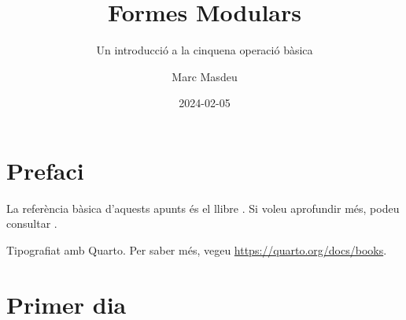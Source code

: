 \documentclass[
  letterpaper,
  DIV=11,
  numbers=noendperiod]{scrreprt}
\title{Formes Modulars}
\subtitle{Un introducció a la cinquena operació bàsica}
\author{Marc Masdeu}
\date{2024-02-05}
\renewcommand*\contentsname{Taula de continguts}
\newcommand\contentsname{Taula de continguts}
\theoremstyle{plain}
\theoremstyle{plain}
\theoremstyle{definition}
\theoremstyle{plain}
\theoremstyle{plain}
\theoremstyle{definition}
\theoremstyle{remark}
\begin{document}
\maketitle

\renewcommand*\contentsname{Taula de continguts}
{
\hypersetup{linkcolor=}
\setcounter{tocdepth}{1}
\tableofcontents
}

\chapter*{Prefaci}\label{prefaci}


La referència bàsica d'aquests apunts és el llibre \textcite{serre2012}.
Si voleu aprofundir més, podeu consultar \textcite{diamond-shurman2005}.

Tipografiat amb Quarto. Per saber més, vegeu
\url{https://quarto.org/docs/books}.


\chapter{Primer dia}\label{primer-dia}

\providecommand{\QQ}{\mathbb{Q}}
\providecommand{\ZZ}{\mathbb{Z}}
\providecommand{\RR}{\mathbb{R}}
\providecommand{\FF}{\mathbb{F}}
\providecommand{\CC}{\mathbb{C}}
\providecommand{\HH}{\mathbb{H}}

\providecommand{\fX}{\mathfrak{X}}

\providecommand{\SL}{\operatorname{SL}}
\providecommand{\GL}{\operatorname{GL}}
\providecommand{\PSL}{\operatorname{PSL}}
\providecommand{\PGL}{\operatorname{PGL}}

\providecommand{\lto}{\longrightarrow}
\providecommand{\dfn}{\ensuremath{:=}}
\providecommand{\surjects}{\twoheadrightarrow}
\providecommand{\injects}{\hookrightarrow}
\providecommand{\id}{\ensuremath \text{Id}}
\providecommand{\tns}[1][]{\otimes_{\!#1}}
\providecommand{\mtx}[4]{\left(\begin{matrix}#1&#2\\#3&#4\end{matrix}\right)}
\providecommand{\mat}[1]{\left(\begin{matrix}#1\end{matrix}\right)}
\providecommand{\smat}[1]{\left(\begin{smallmatrix}#1\end{smallmatrix}\right)}
\providecommand{\smtx}[4]{\left(\begin{smallmatrix}#1&#2\\#3&#4\end{smallmatrix}\right)}
\end{document}
